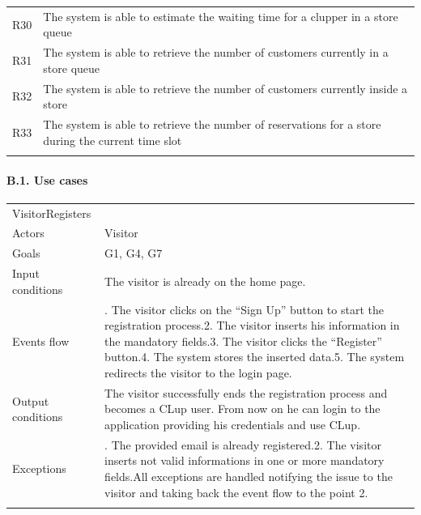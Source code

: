 \begin{longtable}[]{@{}
  >{\raggedright\arraybackslash}p{}
  >{\raggedright\arraybackslash}p{}@{}}
R30 & The system is able to estimate the waiting time for a clupper in a
store queue \\ \addlinespace
R31 & The system is able to retrieve the number of customers currently
in a store queue \\ \addlinespace
R32 & The system is able to retrieve the number of customers currently
inside a store \\ \addlinespace
R33 & The system is able to retrieve the number of reservations for a
store during the current time slot \\ \addlinespace
\bottomrule
\end{longtable}

\hypertarget{b.1.-use-cases}{%
\paragraph{B.1. Use cases}\label{b.1.-use-cases}}

\begin{longtable}[]{@{}
  >{\raggedright\arraybackslash}p{}
  >{\raggedright\arraybackslash}p{}@{}}
\toprule
VisitorRegisters & \\ \addlinespace
\midrule
\endhead
Actors & Visitor \\ \addlinespace
Goals & G1, G4, G7 \\ \addlinespace
Input conditions & The visitor is already on the home
page. \\ \addlinespace
Events flow & 1. The visitor clicks on the ``Sign Up'' button to start
the registration process.2. The visitor inserts his information in the
mandatory fields.3. The visitor clicks the ``Register'' button.4. The
system stores the inserted data.5. The system redirects the visitor to
the login page. \\ \addlinespace
Output conditions & The visitor successfully ends the registration
process and becomes a CLup user. From now on he can login to the
application providing his credentials and use CLup. \\ \addlinespace
Exceptions & 1. The provided email is already registered.2. The visitor
inserts not valid informations in one or more mandatory fields.All
exceptions are handled notifying the issue to the visitor and taking
back the event flow to the point 2. \\ \addlinespace
\bottomrule
\end{longtable}

